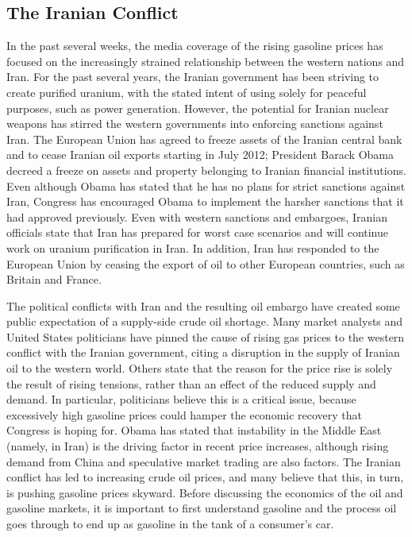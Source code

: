 \documentclass[11pt,twocolumn]{article}
\author{Andrew Gibiansky}
\newcommand{\tab}[0] {\hspace*{24pt}}
\begin{document}
\subsection*{The Iranian Conflict}
\tab In the past several weeks, the media coverage of the rising gasoline prices has focused on the increasingly strained relationship between the western nations and Iran. For the past several years, the Iranian government has been striving to create purified uranium, with the stated intent of using solely for peaceful purposes, such as power generation\cite{1}. However, the potential for Iranian nuclear weapons has stirred the western governments into enforcing sanctions against Iran. The European Union has agreed to freeze assets of the Iranian central bank and to cease Iranian oil exports starting in July 2012; President Barack Obama decreed a freeze on assets and property belonging to Iranian financial institutions\cite{2}. Even although Obama has stated that he has no plans for strict sanctions against Iran, Congress has encouraged Obama to implement the harsher sanctions that it had approved previously\cite{4}. Even with western sanctions and embargoes, Iranian officials state that Iran has prepared for worst case scenarios and will continue work on uranium purification in Iran. In addition, Iran has responded to the European Union by ceasing the export of oil to other European countries, such as Britain and France\cite{3}.

\tab The political conflicts with Iran and the resulting oil embargo have created some public expectation of a supply-side crude oil shortage. Many market analysts and United States politicians have pinned the cause of rising gas prices to the western conflict with the Iranian government, citing a disruption in the supply of Iranian oil to the western world. Others state that the reason for the price rise is solely the result of rising tensions, rather than an effect of the reduced supply and demand. In particular, politicians believe this is a critical issue, because excessively high gasoline prices could hamper the economic recovery that Congress is hoping for. Obama has stated that instability in the Middle East (namely, in Iran) is the driving factor in recent price increases, although rising demand from China and speculative market trading are also factors. The Iranian conflict has led to increasing crude oil prices, and many believe that this, in turn, is pushing gasoline prices skyward. Before discussing the economics of the oil and gasoline markets, it is important to first understand gasoline and the process oil goes through to end up as gasoline in the tank of a consumer's car.
\end{document}
